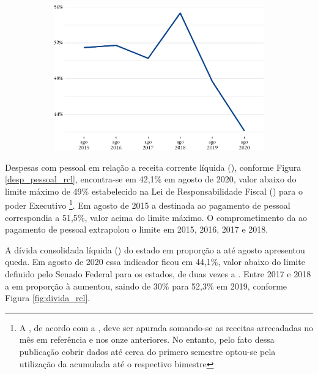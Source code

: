 \begin{figure}[!h]
\begin{subfigure}{\linewidth}
		\includegraphics{fig/desp_pessoal_rcl-1.pdf}
	\end{subfigure}
\end{figure}

Despesas com pessoal em relação a receita corrente líquida (),
conforme Figura \ref{desp_pessoal_rcl}, encontra-se em 42,1\% em agosto
de 2020, valor abaixo do limite máximo de 49\% estabelecido na Lei de
Responsabilidade Fiscal () para o poder Executivo
\footnote{A , de acordo com a , deve ser apurada somando-se as receitas arrecadadas no mês em referência e nos onze anteriores. No entanto, pelo fato  dessa publicação cobrir dados até cerca do primero semestre optou-se pela utilização da  acumulada até o respectivo bimestre}.
Em agosto de 2015 a  destinada ao pagamento de pessoal
correspondia a 51,5\%, valor acima do limite máximo. O comprometimento
da  ao pagamento de pessoal extrapolou o limite em 2015, 2016,
2017 e 2018.

A dívida consolidada líquida () do estado em proporção a
 até agosto apresentou queda. Em agosto de 2020 essa indicador
ficou em 44,1\%, valor abaixo do limite definido pelo Senado Federal
para os estados, de duas vezes a . Entre 2017 e 2018 a
 em proporção à  aumentou, saindo de 30\% para
52,3\% em 2019, conforme Figura \ref{fig:divida_rcl}.

